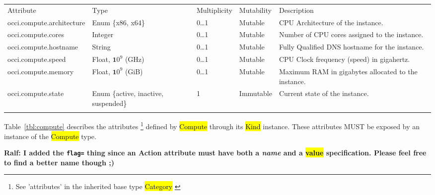 \documentclass[10pt,a4paper]{article}
\begin{document}
	{
		\begin{tabular}{lp{2.5cm}p{1cm}lp{6cm}}
		\toprule
		Attribute&Type&Multi\-plicity&Mutability&Description\\
		\colrule
		occi.compute.architecture & Enum \{x86, x64\} & 0\ldots1 
		& Mutable & CPU Architecture of the instance.\\
		occi.compute.cores & Integer & 0\ldots1 & Mutable 
		& Number of CPU cores assigned to the instance.\\
		occi.compute.hostname & String & 0\ldots1 
		& Mutable & Fully Qualified DNS hostname for the instance.\\
		occi.compute.speed & Float, ${\mathbf 10}^9$ (GHz) & 0\ldots1 
		& Mutable & CPU Clock frequency (speed) in gigahertz.\\
		occi.compute.memory & Float, ${\mathbf 10}^9$ (GiB) & 0\ldots1 
		& Mutable & Maximum RAM in gigabytes allocated to the instance.\\
		occi.compute.state & Enum \{active, inactive, suspended\} & 1 
		& Immutable & Current state of the instance.\\
		\botrule
		\end{tabular}
	}

Table~\ref{tbl:compute} describes the attributes%
\footnote{See ’attributes’ in the inherited 
base type \hl{Category}  \cite{occi:core}} 
defined by \hl{Compute} through its \hl{Kind} instance. These attributes
MUST be exposed by an instance of the \hl{Compute} type.

{\bf Ralf: I added the {\tt flag=} thing since an Action attribute must have both a {\em name} and a \hl{value} specification. Please feel free to find a better name though ;)}
\end{document}
